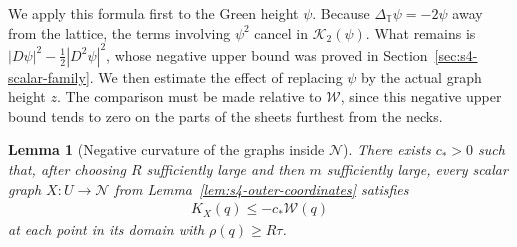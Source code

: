 \documentclass[a4paper,11pt,oneside,reqno]{amsart}
\numberwithin{equation}{section}
\newtheorem{lemma}[theorem]{Lemma}
\theoremstyle{definition}
\begin{document}
We apply this formula first to the Green height $\psi$.
Because $\Delta_{\mathbb T}\psi=-2\psi$ away from the lattice,
the terms involving $\psi^2$ cancel in
$\mathcal K_2(\psi)$. What remains is
$|D\psi|^2-\tfrac12|D^2\psi|^2$, whose negative upper
bound was proved in Section~\ref{sec:s4-scalar-family}.
We then estimate the effect of replacing $\psi$ by the
actual graph height $z$. The comparison must be made
relative to $\mathcal W$, since this negative upper
bound tends to zero on the parts of the sheets furthest
from the necks.

\begin{lemma}[Negative curvature of the graphs inside $\mathcal N$]
    \label{lem:s4-scalar-negative-curvature}
    There exists $c_*>0$ such that, after choosing $R$
    sufficiently large and then $m$ sufficiently large,
    every scalar graph $X:U\to\mathcal N$ from
    Lemma~\ref{lem:s4-outer-coordinates} satisfies
    \begin{align}
        \label{eq:s4-scalar-negative-curvature}
        K_X(q)\leq-c_*\mathcal W(q)
    \end{align}
    at each point in its domain with $\rho(q)\geq R\tau$.
\end{lemma}
\end{document}
